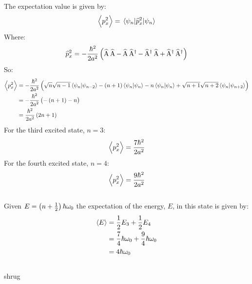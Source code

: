 \subsection{}
The expectation value is given by:
\begin{equation*}
    \expectationvalue{p_x^2} = \expectationvalue{\widehat{p}_x^2}{\psi_n}
\end{equation*}
Where:
\begin{equation*}
    \widehat{p}_x^2 = - \frac{\hbar^2}{2a^2} \del{\loweringoperator \loweringoperator - \loweringoperator \raisingoperator - \raisingoperator \loweringoperator + \raisingoperator \raisingoperator}
\end{equation*}
So:
\begin{align*}
    \expectationvalue{p_x^2} & = - \frac{\hbar^2}{2a^2} \del{\sqrt{n} \sqrt{n-1} \braket{\psi_n}{\psi_{n-2}} - \del{n+1} \braket{\psi_n} - n \braket{\psi_n} + \sqrt{n+1} \sqrt{n+2} \braket{\psi_n}{\psi_{n+2}}}\\
    & =  - \frac{\hbar^2}{2a^2} \del{- \del{n+1} - n}\\
    & = \frac{\hbar^2}{2a^2} \del{2n + 1}
\end{align*}
For the third excited state, $ n = 3 $:
\begin{equation*}
    \expectationvalue{p_x^2} = \frac{7 \hbar^2}{2a^2}
\end{equation*}
For the fourth excited state, $ n = 4 $:
\begin{equation*}
    \expectationvalue{p_x^2} = \frac{9 \hbar^2}{2a^2}
\end{equation*}

\subsection{}
Given $ E = \del{n + \frac{1}{2}} \hbar \omega_0 $ the expectation of the energy, $ E $, in this state is given by:
\begin{align*}
    \expectationvalue{E} & = \frac{1}{2}E_3 + \frac{1}{2}E_4\\
    & = \frac{7}{4} \hbar \omega_0 + \frac{9}{4} \hbar \omega_0\\
    & = 4 \hbar \omega_0
\end{align*}

\subsection{}
shrug

